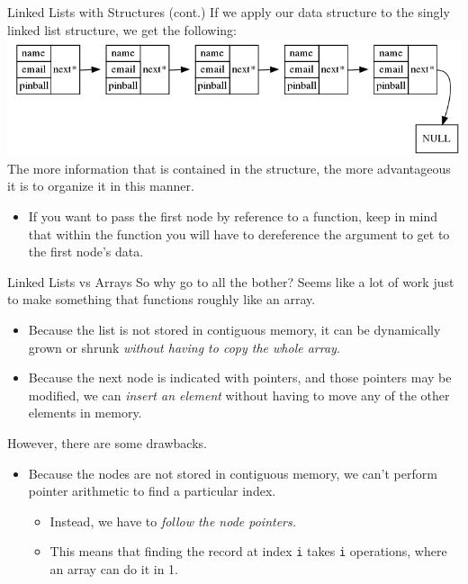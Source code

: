 \documentclass[11pt]{beamer}
\begin{document}
\begin{frame}{Linked Lists with Structures (cont.)}
If we apply our data structure to the singly linked list structure, we get the following:
\center
\includegraphics[scale=0.3]{SLL.png}
\flushleft
The more information that is contained in the structure, the more advantageous it is to organize it in this manner.  
\begin{itemize}
\item If you want to pass the first node by reference to a function, keep in mind that within the function you will have to dereference the argument to get to the first node's data. 
\end{itemize}
\end{frame}

\begin{frame}{Linked Lists vs Arrays}
So why go to all the bother?  Seems like a lot of work just to make something that functions roughly like an array.  
\begin{itemize}
\item Because the list is not stored in contiguous memory, it can be dynamically grown or shrunk \emph{without having to copy the whole array}.  
\item Because the next node is indicated with pointers, and those pointers may be modified, we can \emph{insert an element} without having to move any of the other elements in memory.  
\end{itemize}
However, there are some drawbacks.
\begin{itemize}
\item Because the nodes are not stored in contiguous memory, we can't perform pointer arithmetic to find a particular index.  
\begin{itemize}
\item Instead, we have to \emph{follow the node pointers.}
\item This means that finding the record at index \texttt{i} takes \texttt{i} operations, where an array can do it in 1.  
\end{itemize}
\end{itemize}
\end{frame}
\end{document}
